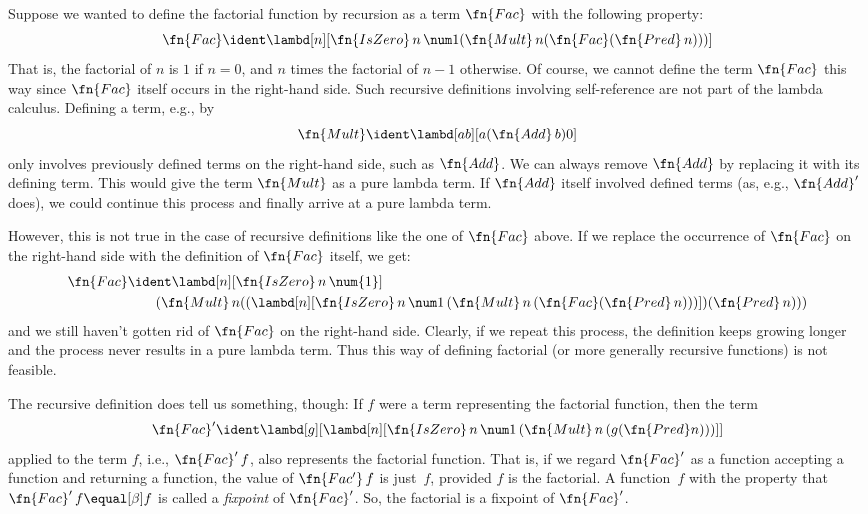 \documentclass[../../../include/open-logic-section]{subfiles}
\begin{document}


Suppose we wanted to define the factorial function by recursion as a
term $\fn{Fac}$ with the following property:
\[
\fn{Fac} \ident \lambd[n][\fn{IsZero}\, n\, \num 1 (\fn{Mult}\, n (\fn{Fac}(\fn{Pred} \, n)))]
\]
That is, the factorial of $n$ is $1$ if $n = 0$, and $n$ times the
factorial of $n-1$ otherwise.  Of course, we cannot define the term
$\fn{Fac}$ this way since $\fn{Fac}$ itself occurs in the right-hand
side. Such recursive definitions involving self-reference
are not part of the lambda calculus. Defining a term, e.g., by
\[
\fn{Mult} \ident \lambd[ab][a (\fn{Add}\, b) 0]
\]
only involves previously defined terms on the right-hand side, such as
$\fn{Add}$. We can always remove $\fn{Add}$ by replacing it with its
defining term.  This would give the term $\fn{Mult}$ as a pure lambda
term. If $\fn{Add}$ itself involved defined terms (as, e.g.,
$\fn{Add}'$ does), we could continue this process and finally arrive at
a pure lambda term.

However, this is not true in the case of recursive definitions like the
one of $\fn{Fac}$ above. If we replace the occurrence of $\fn{Fac}$ on
the right-hand side with the definition of $\fn{Fac}$ itself, we get:
\begin{align*}
  \fn{Fac} & \ident \lambd[n][\fn{IsZero}\, n\, \num{1}] \\
    & \qquad (\fn{Mult}\, n
  ((\lambd[n][\fn{IsZero} \, n \, \num 1\, (\fn{Mult}\, n\, (\fn{Fac}
    (\fn{Pred}\, n)))]) (\fn{Pred}\, n)))
\end{align*}
and we still haven't gotten rid of $\fn{Fac}$ on the right-hand
side. Clearly, if we repeat this process, the definition keeps growing
longer and the process never results in a pure lambda term. Thus this
way of defining factorial (or more generally recursive functions)
is not feasible.

The recursive definition does tell us something, though: If $f$ were a
term representing the factorial function, then the term
\[
\fn{Fac}' \ident \lambd[g][\lambd[n][\fn{IsZero} \, n \, \num 1\, (\fn{Mult} \, n\, (g (\fn{Pred} n)))]]
\]
applied to the term $f$, i.e., $\fn{Fac}'\,f$, also represents the
factorial function.  That is, if we regard $\fn{Fac}'$ as a function
accepting a function and returning a function, the value of
$\fn{Fac'}\, f$ is just~$f$, provided $f$ is the factorial. A
function~$f$ with the property that $\fn{Fac}' \, f \equal[\beta] f$ is called
a \emph{fixpoint} of $\fn{Fac}'$. So, the factorial is a fixpoint of
$\fn{Fac}'$.
\end{document}
